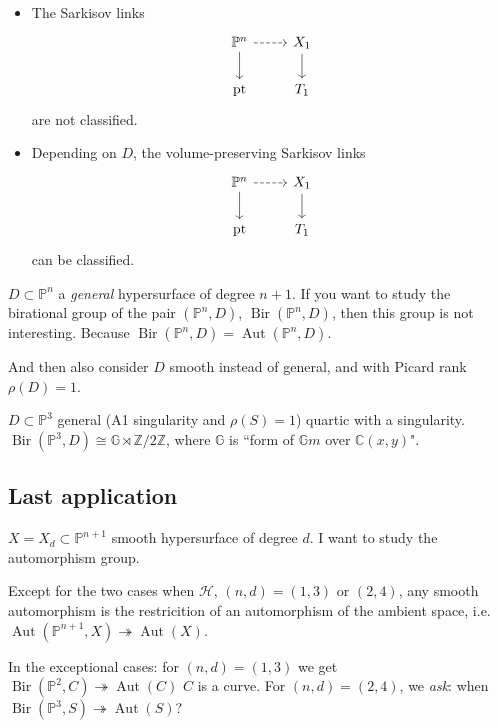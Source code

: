 \begin{remark}\leavevmode
\begin{itemize}
\item The Sarkisov links
\[\begin{tikzcd}
	 \mathbb{P}^n\arrow[r, dashed]\arrow[d]&X_1\arrow[d]\\\operatorname{pt}&T_1
\end{tikzcd}\]
are not classified.

\item Depending on \(D\), the volume-preserving Sarkisov links
\[\begin{tikzcd}
	 \mathbb{P}^n\arrow[r, dashed]\arrow[d]&X_1\arrow[d]\\\operatorname{pt}&T_1
\end{tikzcd}\]
can be classified.
\end{itemize}
\end{remark}

\begin{thm}\leavevmode
\(D \subset \mathbb{P}^n\) a \textit{general} hypersurface of degree \(n+1\). If you want to study the birational group of the pair \((\mathbb{P}^n,D)\), \(\operatorname{Bir}(\mathbb{P}^n,D)\), then this group is not interesting. Because \(\operatorname{Bir}(\mathbb{P}^n,D)=\operatorname{Aut}(\mathbb{P}^n,D)\).

And then also consider \(D\) smooth instead of general, and with Picard rank \(\rho(D)=1\).
\end{thm}

\begin{thm}[A-C-M]\leavevmode
\(D \subset \mathbb{P}^3\) general (A1 singularity and \(\rho(S)=1\)) quartic with a singularity. \(\operatorname{Bir}(\mathbb{P}^3,D)\cong \mathbb{G} \rtimes \mathbb{Z}/2\mathbb{Z}\), where \(\mathbb{G}\) is ``form of \(\mathbb{G}m\) over \(\mathbb{C}(x,y)\)".
\end{thm}

\subsection{Last application}

\(X=X_d \subset \mathbb{P}^{n+1}\) smooth hypersurface of degree \(d\). I want to study the automorphism group.

\begin{thm}\leavevmode
Except for the two cases when \(\mathcal{H}\), \((n,d)=(1,3)\) or \((2,4)\), any smooth automorphism is the restricition of an automorphism of the ambient space, i.e. \(\operatorname{Aut}(\mathbb{P}^{n+1},X)\twoheadrightarrow \operatorname{Aut}(X)\).

In the exceptional cases: for \((n,d)=(1,3)\) we get \(\operatorname{Bir}(\mathbb{P}^2,C) \twoheadrightarrow \operatorname{Aut}(C)\) {\color{6}\(C\) is a curve}. For \((n,d)=(2,4)\), we  \textit{ask}: when \(\operatorname{Bir}(\mathbb{P}^3,S) \twoheadrightarrow \operatorname{Aut}(S)\)?
\end{thm}


